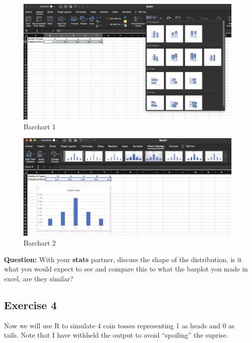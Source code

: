 \documentclass[
  10pt,
  letterpaper,
  DIV=11,
  numbers=noendperiod]{scrartcl}
\begin{document}
\begin{figure}[H]

{\centering \includegraphics{images/Barchart_1.png}

}

\caption{Barchart 1}

\end{figure}%
\begin{figure}[H]

{\centering \includegraphics{images/Barchart_2.png}

}

\caption{Barchart 2}

\end{figure}%

\textbf{Question:} With your \textbf{stats} partner, discuss the shape
of the distribution, is it what you would expect to see and compare this
to what the barplot you made in excel, are they similar?

\subsection{Exercise 4}\label{exercise-4}

Now we will use R to simulate 4 coin tosses representing 1 as heads and
0 as tails. Note that I have withheld the output to avoid ``spoiling''
the suprise.
\end{document}
